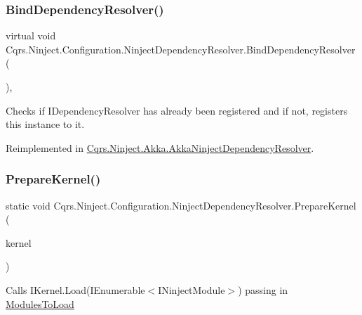 \subsubsection{\texorpdfstring{Bind\+Dependency\+Resolver()}{BindDependencyResolver()}}
{\footnotesize\ttfamily virtual void Cqrs.\+Ninject.\+Configuration.\+Ninject\+Dependency\+Resolver.\+Bind\+Dependency\+Resolver (\begin{DoxyParamCaption}{ }\end{DoxyParamCaption})\hspace{0.3cm}{\ttfamily [protected]}, {\ttfamily [virtual]}}



Checks if I\+Dependency\+Resolver has already been registered and if not, registers this instance to it. 



Reimplemented in \hyperlink{classCqrs_1_1Ninject_1_1Akka_1_1AkkaNinjectDependencyResolver_ab7ba3c0a331d115073b5118673984507_ab7ba3c0a331d115073b5118673984507}{Cqrs.\+Ninject.\+Akka.\+Akka\+Ninject\+Dependency\+Resolver}.

\mbox{\label{classCqrs_1_1Ninject_1_1Configuration_1_1NinjectDependencyResolver_a00f928f47792a9945513b239a5b82293_a00f928f47792a9945513b239a5b82293}} 
\subsubsection{\texorpdfstring{Prepare\+Kernel()}{PrepareKernel()}}
{\footnotesize\ttfamily static void Cqrs.\+Ninject.\+Configuration.\+Ninject\+Dependency\+Resolver.\+Prepare\+Kernel (\begin{DoxyParamCaption}\item[{I\+Kernel}]{kernel }\end{DoxyParamCaption})\hspace{0.3cm}{\ttfamily [static]}}



Calls I\+Kernel.\+Load(\+I\+Enumerable$<$\+I\+Ninject\+Module$>$) passing in \hyperlink{classCqrs_1_1Ninject_1_1Configuration_1_1NinjectDependencyResolver_a45264a8fae5380727d1af41bc2155381_a45264a8fae5380727d1af41bc2155381}{Modules\+To\+Load} 


